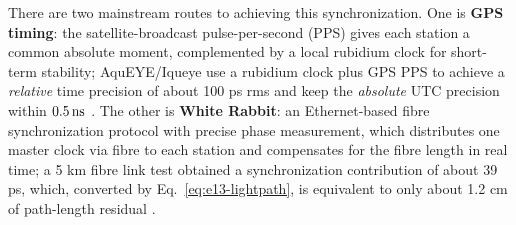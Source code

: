 There are two mainstream routes to achieving this synchronization. One is \textbf{GPS timing}: the satellite-broadcast pulse-per-second (PPS) gives each station a common absolute moment, complemented by a local rubidium clock for short-term stability; AquEYE/Iqueye use a rubidium clock plus GPS PPS to achieve a \emph{relative} time precision of about 100 ps rms and keep the \emph{absolute} UTC precision within $0.5\,{\rm ns}$ \citep{2009A&A...508..531N,2015SPIE.9504E..0CZ}. The other is \textbf{White Rabbit}: an Ethernet-based fibre synchronization protocol with precise phase measurement, which distributes one master clock via fibre to each station and compensates for the fibre length in real time; a 5 km fibre link test obtained a synchronization contribution of about 39 ps, which, converted by Eq.~\eqref{eq:e13-lightpath}, is equivalent to only about 1.2 cm of path-length residual \citep{2013NIMPA.725..187J,2020RScI...91a3108W}.

